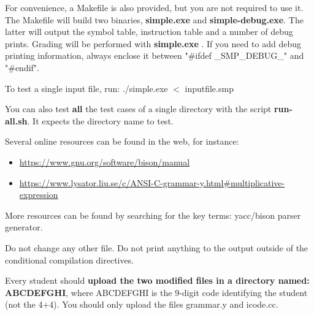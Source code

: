 \documentclass[letter,10pt]{article}
\begin{document}
For convenience, a Makefile is also provided, but you are not required to use it.
The Makefile will build two binaries, {\bf simple.exe} and {\bf simple-debug.exe}. The latter will output
the symbol table, instruction table and a number of debug prints. Grading will be performed with
{\bf simple.exe} . If you need to add debug printing information, always enclose it between "\#ifdef \_SMP\_DEBUG\_" and "\#endif".

To test a single input file, run: ./simple.exe $<$ inputfile.smp

You can also test {\bf all} the test cases of a single directory with the script {\bf run-all.sh}.
It expects the directory name to test.

Several online resources can be found in the web, for instance:
\begin{itemize}
\item
\url{https://www.gnu.org/software/bison/manual}
\item
\url{https://www.lysator.liu.se/c/ANSI-C-grammar-y.html#multiplicative-expression}
\end{itemize}

More resources can be found by searching for the key terms: yacc/bison parser generator.

Do not change any other file. Do not print anything to the output outside of the conditional compilation directives.

Every student should {\bf upload the two modified files in a directory named: ABCDEFGHI}, where ABCDEFGHI is the 9-digit code identifying the student (not the 4+4).
You should only upload the files grammar.y and icode.cc.
\end{document}
